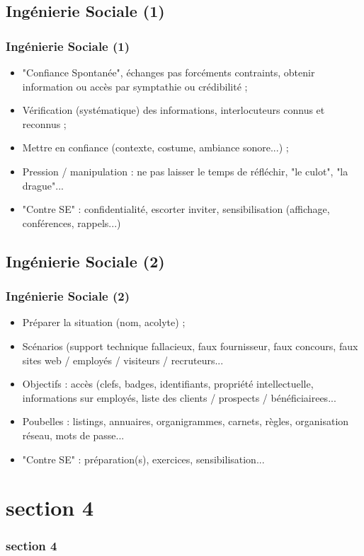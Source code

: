 \documentclass[slidetop,11pt]{beamer}
\begin{document}
\subsection{Ing{\'e}nierie Sociale (1)}
\begin{frame}
	\frametitle{Ing{\'e}nierie Sociale (1)}
	\begin{itemize}
		\item "Confiance Spontan{\'e}e", {\'e}changes pas forc{\'e}ments contraints, obtenir information ou acc{\`e}s par symptathie ou cr{\'e}dibilit{\'e} ; 
		\item V{\'e}rification (syst{\'e}matique) des informations, interlocuteurs connus et reconnus ; 
		\item Mettre en confiance (contexte, costume, ambiance sonore...) ; 
		\item Pression / manipulation : ne pas laisser le temps de r{\'e}fl{\'e}chir, "le culot", "la drague"...
		\item "Contre SE" : confidentialit{\'e}, escorter inviter, sensibilisation (affichage, conf{\'e}rences, rappels...)
	\end{itemize}
\end{frame}

\subsection{Ing{\'e}nierie Sociale (2)}
\begin{frame}
	\frametitle{Ing{\'e}nierie Sociale (2)}
	\begin{itemize}
		\item Pr{\'e}parer la situation (nom, acolyte) ; 
		\item Sc{\'e}narios (support technique fallacieux, faux fournisseur, faux concours, faux sites web / employ{\'e}s / visiteurs / recruteurs...
		\item Objectifs : acc{\`e}s (clefs, badges, identifiants, propri{\'e}t{\'e} intellectuelle, informations sur employ{\'e}s, liste des clients / prospects / b{\'e}n{\'e}ficiairees...
		\item Poubelles : listings, annuaires, organigrammes, carnets, r{\`e}gles, organisation r{\'e}seau, mots de passe...
		\item "Contre SE" : pr{\'e}paration(s), exercices, sensibilisation...
	\end{itemize}
\end{frame}

\section{section 4}
\begin{frame}
	\frametitle{section 4}
	\tableofcontents[sections=4,currentsection,subsectionstyle=show/shaded/hide] %
\end{frame}
\end{document}
